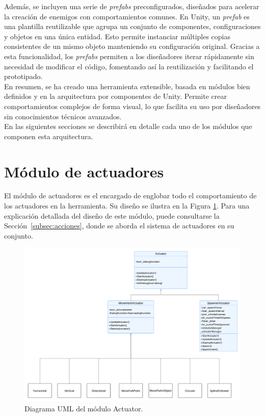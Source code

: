 Además, se incluyen una serie de \textit{prefabs} preconfigurados, diseñados para acelerar la creación de enemigos con comportamientos comunes. En Unity, un \textit{prefab} es una plantilla reutilizable que agrupa un conjunto de componentes, configuraciones y objetos en una única entidad. Esto permite instanciar múltiples copias consistentes de un mismo objeto manteniendo su configuración original. Gracias a esta funcionalidad, los \textit{prefabs} permiten a los diseñadores iterar rápidamente sin necesidad de modificar el código, fomentando así la reutilización y facilitando el prototipado.\\

En resumen, se ha creado una herramienta extensible, basada en módulos bien definidos y en la arquitectura por componentes de Unity. Permite crear comportamientos complejos de forma visual, lo que facilita su uso por diseñadores sin conocimientos técnicos avanzados.\\

En las siguientes secciones se describirá en detalle cada uno de los módulos que componen esta arquitectura.

\section{Módulo de actuadores}

El módulo de actuadores es el encargado de englobar todo el comportamiento de los actuadores en la herramienta. Su diseño se ilustra en la Figura \ref{fig:ActuatorUML}. Para una explicación detallada del diseño de este módulo, puede consultarse la Sección~\ref{subsec:acciones}, donde se aborda el sistema de actuadores en su conjunto.

\begin{figure}[t]
	\centering
	\includegraphics[width = 1\textwidth]{Imagenes/UMLActuator.png}
	\caption{Diagrama UML del módulo Actuator.}
	\label{fig:ActuatorUML}
\end{figure}


